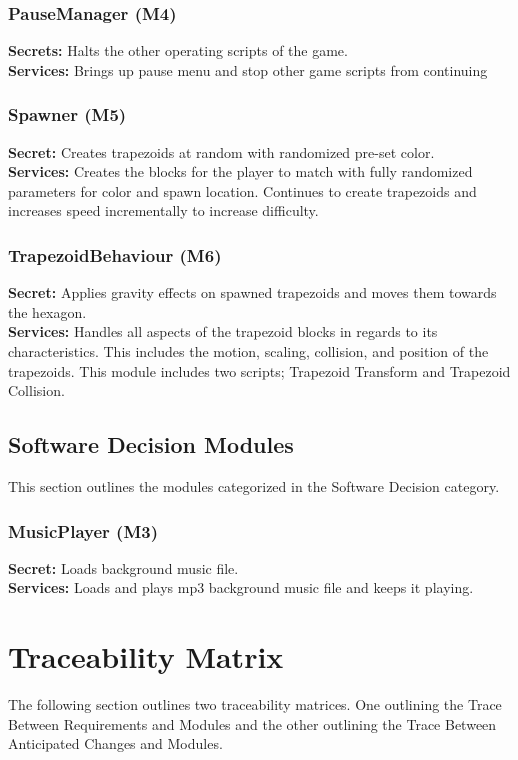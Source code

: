\documentclass[12pt, titlepage]{article}
\begin{document}
\subsubsection{PauseManager (M4)}
\noindent \textbf{Secrets:} Halts the other operating scripts of the game.\\
\textbf{Services:} Brings up pause menu and stop other game scripts from continuing 

\subsubsection{Spawner (M5)}
\noindent \textbf{Secret:} Creates trapezoids at random with randomized pre-set color. \\
\textbf{Services:} Creates the blocks for the player to match with fully randomized parameters for color and spawn location. Continues to create trapezoids and increases speed incrementally to increase difficulty. 

\subsubsection{TrapezoidBehaviour (M6)}
\noindent \textbf{Secret:} Applies gravity effects on spawned trapezoids and moves them towards the hexagon. \\
\textbf{Services:} Handles all aspects of the trapezoid blocks in regards to its characteristics. This includes the motion, scaling, collision, and position of the trapezoids. This module includes two scripts; Trapezoid Transform and Trapezoid Collision.


\subsection{Software Decision Modules}
\noindent This section outlines the modules categorized in the Software Decision category.
\subsubsection{MusicPlayer (M3)}
\noindent \textbf{Secret:} Loads background music file.\\
\textbf{Services:} Loads and plays mp3 background music file and keeps it playing. 


\section{Traceability Matrix}
\noindent The following section outlines two traceability matrices. One outlining the Trace Between Requirements and Modules and the other outlining the Trace Between Anticipated Changes and Modules.
\end{document}
